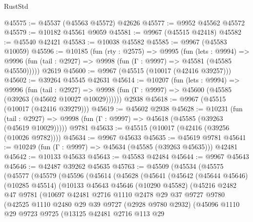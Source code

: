 \begin{lexlean}{RustStd}
\begin{coremodule}
@45575 := @45537 (@45563 @45572) @42626
@45577 := @9952 @45562 @45572
@45579 := @10182 @45561 @9059
@45581 := @9967 (@45515 @42418)
@45582 := @45540 @42421
@45583 := @10038 @45582
@45585 := @9967 (@45583 @10059)
@45596 := @10185
    (fun (rty : @2575) =>
    @9995
      (fun (lets : @9994) =>
      @9996 (fun (tail : @2927) => @9998 (fun (Γ : @9997) => @45581 (@45585 @45550)))))
    @2619
@45600 := @9967 (@45515 (@10017 (@42416 @39257)))
@45602 := @39264 @45545 @42631
@45614 := @10207
    (fun (lets : @9994) =>
    @9996
      (fun (tail : @2927) =>
      @9998 (fun (Γ : @9997) => @45600 (@45585 (@39263 (@45602 @10027 @10029))))))
    @2938
@45618 := @9967 (@45515 (@10017 (@42416 @39279)))
@45619 := @45602 @2938
@45628 := @10231
    (fun (tail : @2927) => @9998 (fun (Γ : @9997) => @45618 (@45585 (@39263 (@45619 @10029)))))
    @9781
@45633 := @45515 (@10017 (@42416 (@39256 (@10026 @9782))))
@45634 := @9967 @45633
@45635 := @45619 @9781
@45641 := @10249 (fun (Γ : @9997) => @45634 (@45585 (@39263 @45635))) @42481
@45642 := @10133 @45633
@45643 := @45583 @42484
@45644 := @9967 @45643
@45646 := @42487 @39262 @45635
@45763 := @45509
    (@45534
      (@45575
        (@45577
          (@45579
            (@45596
              (@45614
                (@45628
                  (@45641
                    (@45642
                      (@45644 @45646)
                      (@10285 @45514)
                      (@10133
                        @45643
                        @45646
                        (@10290 @45582)
                        (@45216
                          @2482
                          @47
                          @9781
                          (@10697
                            @42481
                            @2716
                            @1110
                            @2478
                            @29
                            @37
                            @9727
                            @9780
                            (@42525
                              @1110
                              @2480
                              @29
                              @39
                              @9727
                              (@2928 @9780 @2932)
                              (@45096
                                @1110
                                @29
                                @9723
                                @9725
                                (@13125
                                  @42481
                                  @2716
                                  @113
                                  @29

\end{coremodule}
\end{lexlean}
